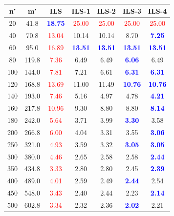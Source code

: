 
\begin{tabular}{|cc|c|cccc|}
\hline
\rowcolor{gray!30} \textbf{n'} &  \textbf{m'} &  \textbf{ILS} &  \textbf{ILS-1} &  \textbf{ILS-2} &  \textbf{ILS-3}&  \textbf{ILS-4}\\ \hline
20 & 41.8 & \textbf{\textcolor{blue}{18.75}} & \textcolor{red}{25.00} & \textcolor{red}{25.00} & \textcolor{red}{25.00} & \textcolor{red}{25.00}\\
40 & 70.8 & \textcolor{red}{13.04} & 10.14 & 10.14 & 8.70 & \textbf{\textcolor{blue}{7.25}}\\
60 & 95.0 & \textcolor{red}{16.89} & \textbf{\textcolor{blue}{13.51}} & \textbf{\textcolor{blue}{13.51}} & \textbf{\textcolor{blue}{13.51}} & \textbf{\textcolor{blue}{13.51}}\\
80 & 119.8 & \textcolor{red}{7.36} & 6.49 & 6.49 & \textbf{\textcolor{blue}{6.06}} & 6.49\\
100 & 144.0 & \textcolor{red}{7.81} & 7.21 & 6.61 & \textbf{\textcolor{blue}{6.31}} & \textbf{\textcolor{blue}{6.31}}\\
120 & 168.8 & \textcolor{red}{13.69} & 11.00 & 11.49 & \textbf{\textcolor{blue}{10.76}} & \textbf{\textcolor{blue}{10.76}}\\
140 & 193.0 & \textcolor{red}{7.46} & 5.16 & 4.97 & 4.78 & \textbf{\textcolor{blue}{4.21}}\\
160 & 217.8 & \textcolor{red}{10.96} & 9.30 & 8.80 & 8.80 & \textbf{\textcolor{blue}{8.14}}\\
180 & 242.0 & \textcolor{red}{5.64} & 3.71 & 3.99 & \textbf{\textcolor{blue}{3.30}} & 3.58\\
200 & 266.8 & \textcolor{red}{6.00} & 4.04 & 3.31 & 3.55 & \textbf{\textcolor{blue}{3.06}}\\
250 & 321.0 & \textcolor{red}{4.93} & 3.59 & 3.32 & \textbf{\textcolor{blue}{3.05}} & \textbf{\textcolor{blue}{3.05}}\\
300 & 380.0 & \textcolor{red}{4.46} & 2.65 & 2.58 & 2.58 & \textbf{\textcolor{blue}{2.44}}\\
350 & 434.8 & \textcolor{red}{3.33} & 2.80 & 2.80 & 2.45 & \textbf{\textcolor{blue}{2.39}}\\
400 & 489.0 & \textcolor{red}{4.01} & 2.59 & 2.49 & \textbf{\textcolor{blue}{2.44}} & 2.54\\
450 & 548.0 & \textcolor{red}{3.43} & 2.40 & 2.44 & 2.23 & \textbf{\textcolor{blue}{2.14}}\\
500 & 602.8 & \textcolor{red}{3.34} & 2.32 & 2.36 & \textbf{\textcolor{blue}{2.02}} & 2.21\\
\hline
\end{tabular}